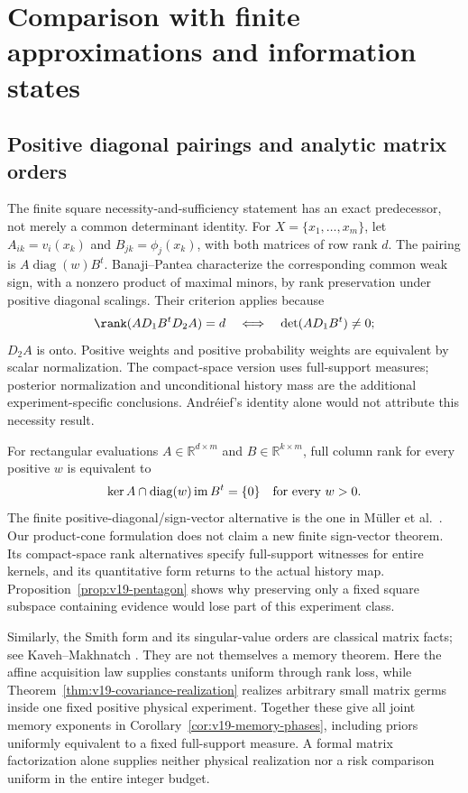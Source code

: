 \documentclass[11pt]{amsart}
\theoremstyle{definition}\newtheorem{definition}[theorem]{Definition}
\theoremstyle{remark}\newtheorem{remark}[theorem]{Remark}
\newcommand{\R}{\mathbb R}\newcommand{\N}{\mathbb N}\newcommand{\C}{\mathbb C}
\begin{document}
\section{Comparison with finite approximations and information states}
\label{sec:literature-comparison}
\subsection{Positive diagonal pairings and analytic matrix orders}
\label{sec:v19-comparison}
The finite square necessity-and-sufficiency statement has an exact
predecessor, not merely a common determinant identity. For
$X=\{x_1,\ldots,x_m\}$, let
$A_{ik}=v_i(x_k)$ and $B_{jk}=\phi_j(x_k)$, with both matrices of
row rank $d$. The pairing is $A\operatorname{diag}(w)B^t$.
Banaji--Pantea \cite[Definition 2.24 and Lemma 2.36]{BanajiPantea2016}
characterize the corresponding common weak sign, with a nonzero
product of maximal minors, by rank preservation under positive
diagonal scalings. Their criterion applies because
\[
 \rank(AD_1B^tD_2A)=d
       \quad\Longleftrightarrow\quad\det(AD_1B^t)\ne0;
\]
$D_2A$ is onto. Positive weights and positive probability weights
are equivalent by scalar normalization. The compact-space version
uses full-support measures; posterior normalization and unconditional
history mass are the additional experiment-specific conclusions.
Andr\'eief's identity alone would not attribute this necessity result.

For rectangular evaluations $A\in\R^{d\times m}$ and
$B\in\R^{k\times m}$, full column rank for every positive $w$ is
equivalent to
\[
 \ker A\cap\operatorname{diag}(w)\operatorname{im}B^t=\{0\}
                     \quad\hbox{for every }w>0.
\]
The finite positive-diagonal/sign-vector alternative is the one in
M\"uller et al.\ \cite[Lemma 2.1]{MullerEtAl2016}. Our product-cone
formulation does not claim a new finite sign-vector theorem. Its
compact-space rank alternatives specify full-support witnesses for
entire kernels, and its quantitative form returns to the actual
history map. Proposition~\ref{prop:v19-pentagon} shows why preserving
only a fixed square subspace containing evidence would lose part of
this experiment class.

Similarly, the Smith form and its singular-value orders are classical
matrix facts; see Kaveh--Makhnatch \cite[Theorem 1.1]{KavehMakhnatch}.
They are not themselves a memory theorem. Here the affine acquisition
law supplies constants uniform through rank loss, while
Theorem~\ref{thm:v19-covariance-realization} realizes arbitrary small
matrix germs inside one fixed positive physical experiment. Together
these give all joint memory exponents in
Corollary~\ref{cor:v19-memory-phases}, including priors uniformly
equivalent to a fixed full-support measure. A formal matrix
factorization alone supplies neither physical realization nor a risk
comparison uniform in the entire integer budget.
\end{document}
